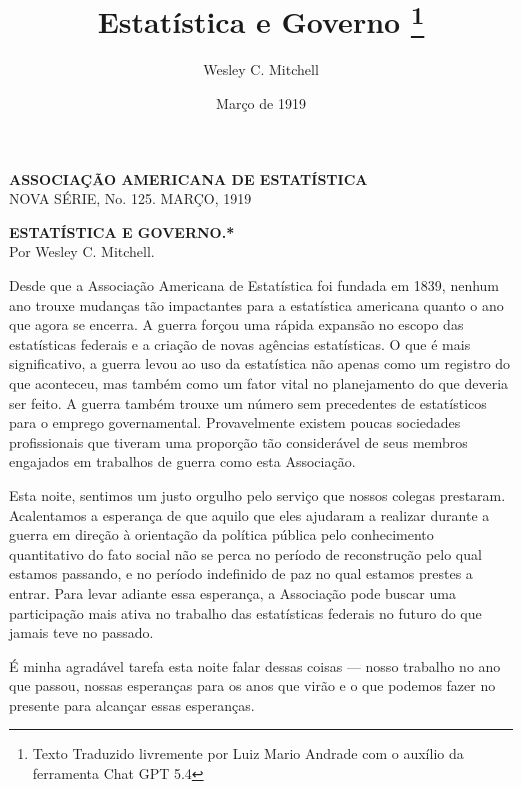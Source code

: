 \documentclass[12pt]{article}
\title{Estatística e Governo \thanks{Texto Traduzido livremente por Luiz Mario Andrade com o auxílio da ferramenta Chat GPT 5.4}}
\author{Wesley C. Mitchell}
\date{Março de 1919}
\begin{document}
\maketitle

\begin{center}
    \textbf{ASSOCIAÇÃO AMERICANA DE ESTATÍSTICA} \\
    NOVA SÉRIE, No. 125. MARÇO, 1919
\end{center}

\vspace{1cm}

\begin{center}
    \textbf{ESTATÍSTICA E GOVERNO.*} \\
    Por Wesley C. Mitchell.
\end{center}

\vspace{0.5cm}

Desde que a Associação Americana de Estatística foi fundada em 1839, nenhum ano trouxe mudanças tão impactantes para a estatística americana quanto o ano que agora se encerra. A guerra forçou uma rápida expansão no escopo das estatísticas federais e a criação de novas agências estatísticas. O que é mais significativo, a guerra levou ao uso da estatística não apenas como um registro do que aconteceu, mas também como um fator vital no planejamento do que deveria ser feito. A guerra também trouxe um número sem precedentes de estatísticos para o emprego governamental. Provavelmente existem poucas sociedades profissionais que tiveram uma proporção tão considerável de seus membros engajados em trabalhos de guerra como esta Associação.

Esta noite, sentimos um justo orgulho pelo serviço que nossos colegas prestaram. Acalentamos a esperança de que aquilo que eles ajudaram a realizar durante a guerra em direção à orientação da política pública pelo conhecimento quantitativo do fato social não se perca no período de reconstrução pelo qual estamos passando, e no período indefinido de paz no qual estamos prestes a entrar. Para levar adiante essa esperança, a Associação pode buscar uma participação mais ativa no trabalho das estatísticas federais no futuro do que jamais teve no passado.

É minha agradável tarefa esta noite falar dessas coisas — nosso trabalho no ano que passou, nossas esperanças para os anos que virão e o que podemos fazer no presente para alcançar essas esperanças.

\end{document}
